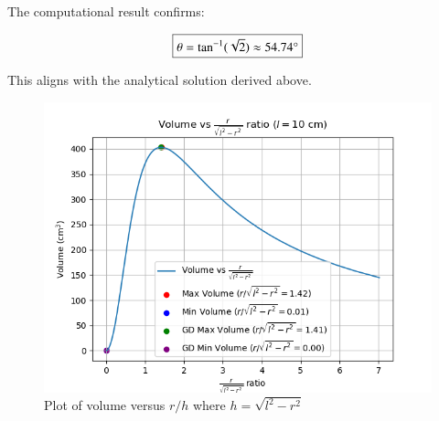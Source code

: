 \documentclass[journal]{IEEEtran}
\begin{document}
The computational result confirms:

\begin{align}
\boxed{\theta = \tan^{-1}(\sqrt{2}) \approx 54.74\degree}
\end{align}

This aligns with the analytical solution derived above.

\begin{figure}[h!]
\centering
\includegraphics[width=\columnwidth]{figs/fig1.png}
\caption{Plot of volume versus $r/h$ where $h=\sqrt{l^2-r^2}$}
\label{stemplot}
\end{figure}
\end{document}
